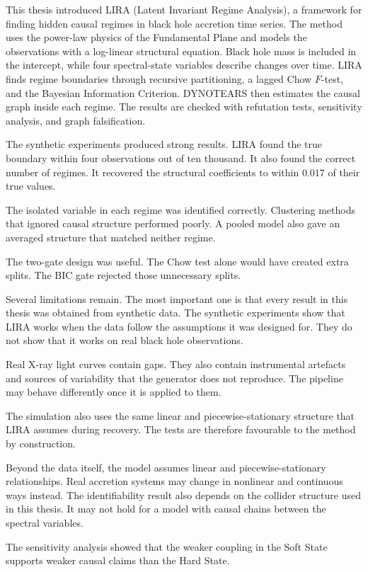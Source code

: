 This thesis introduced LIRA (Latent Invariant Regime Analysis), a framework for
finding hidden causal regimes in black hole accretion time series. The method uses
the power-law physics of the Fundamental Plane and models the observations with a
log-linear structural equation. Black hole mass is included in the intercept, while
four spectral-state variables describe changes over time. LIRA finds regime
boundaries through recursive partitioning, a lagged Chow $F$-test, and the Bayesian
Information Criterion. DYNOTEARS then estimates the causal graph inside each
regime. The results are checked with refutation tests, sensitivity analysis, and graph
falsification.

The synthetic experiments produced strong results. LIRA found the true boundary
within four observations out of ten thousand. It also found the correct number of
regimes. It recovered the structural coefficients to within $0.017$ of their true
values.

The isolated variable in each regime was identified correctly. Clustering methods
that ignored causal structure performed poorly. A pooled model also gave an averaged
structure that matched neither regime.

The two-gate design was useful. The Chow test alone would have created extra splits.
The BIC gate rejected those unnecessary splits.

Several limitations remain. The most important one is that every result in this
thesis was obtained from synthetic data. The synthetic experiments show that LIRA
works when the data follow the assumptions it was designed for. They do not show that
it works on real black hole observations.

Real X-ray light curves contain gaps. They also contain instrumental artefacts and
sources of variability that the generator does not reproduce. The pipeline may behave
differently once it is applied to them.

The simulation also uses the same linear and piecewise-stationary structure that LIRA
assumes during recovery. The tests are therefore favourable to the method by
construction.

Beyond the data itself, the model assumes linear and piecewise-stationary
relationships. Real accretion systems may change in nonlinear and continuous ways
instead. The identifiability result also depends on the collider structure used in
this thesis. It may not hold for a model with causal chains between the spectral
variables.

The sensitivity analysis showed that the weaker coupling in the Soft State supports
weaker causal claims than the Hard State.

